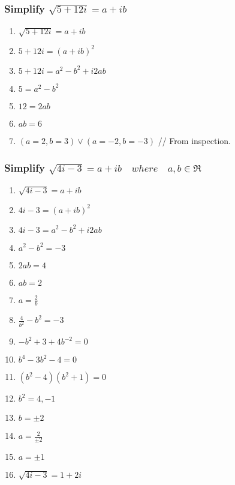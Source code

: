 \documentclass{report}
\newcommand{\realnumbers}{\mathfrak{R}}
\newcommand{\where}{\quad where \quad}
\begin{document}
                \subsubsection{Simplify $\sqrt{5+12i}=a+ib$}
                    \begin{enumerate}
                        \item $\sqrt{5+12i}=a+ib$
                        \item $5+12i=(a+ib)^2$
                        \item $5+12i=a^2-b^2+i2ab$
                        \item $5=a^2-b^2$
                        \item $12=2ab$
                        \item $ab=6$
                        \item $(a=2,b=3)\vee(a=-2,b=-3)$ // From inspection.
                    \end{enumerate}
                \subsubsection{Simplify $\sqrt{4i-3}=a+ib\where a,b\in\realnumbers$}
                    \begin{enumerate}
                        \item $\sqrt{4i-3}=a+ib$
                        \item $4i-3=(a+ib)^2$
                        \item $4i-3=a^2-b^2+i2ab$
                        \item $a^2-b^2=-3$
                        \item $2ab=4$
                        \item $ab=2$
                        \item $a=\frac{2}{b}$
                        \item $\frac{4}{b^2}-b^2=-3$
                        \item $-b^2+3+4b^{-2}=0$
                        \item $b^4-3b^2-4=0$
                        \item $(b^2-4)(b^2+1)=0$
                        \item $b^2=4,-1$
                        \item $b=\pm2$
                        \item $a=\frac{2}{\pm2}$
                        \item $a=\pm1$
                        \item $\sqrt{4i-3}=1+2i$
                    \end{enumerate}
\end{document}
